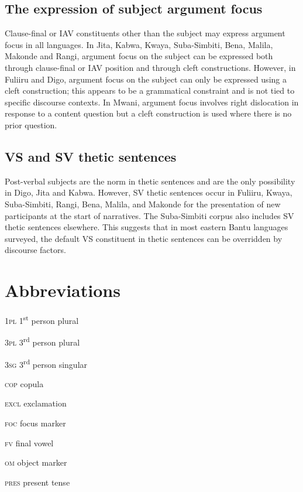 \documentclass[output=paper]{langsci/langscibook}
\begin{document}
\subsection{The expression of subject argument focus}

Clause-final or IAV constituents other than the subject may express argument focus in all languages. In Jita, Kabwa, Kwaya, Suba-Simbiti, Bena, Malila, Makonde and Rangi, argument focus on the subject can be expressed both through clause{}-final or IAV position and through cleft constructions. However, in Fuliiru and Digo, argument focus on the subject can only be expressed using a cleft construction; this appears to be a grammatical constraint and is not tied to specific discourse contexts. In Mwani, argument focus involves right dislocation in response to a content question but a cleft construction is used where there is no prior question.

\subsection{VS and SV thetic sentences}

Post-verbal subjects are the norm in thetic sentences and are the only possibility in Digo, Jita and Kabwa. However, SV thetic sentences occur in Fuliiru, Kwaya, Suba-Simbiti, Rangi, Bena, Malila, and Makonde for the presentation of new participants at the start of narratives. The Suba-Simbiti corpus also includes SV thetic sentences elsewhere. This suggests that in most eastern Bantu languages surveyed, the default VS constituent in thetic sentences can be overridden by discourse factors.

\section*{Abbreviations}

\textsc{1pl}  1\textsuperscript{st} person plural

\textsc{3pl}  3\textsuperscript{rd} person plural

\textsc{3sg}  3\textsuperscript{rd} person singular

\textsc{cop}  copula

\textsc{excl}  exclamation

\textsc{foc}  focus marker

\textsc{fv}  final vowel

\textsc{om}  object marker

\textsc{pres}  present tense
\end{document}
